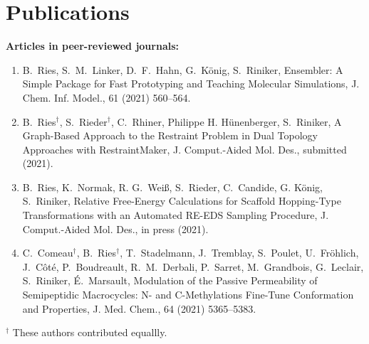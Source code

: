 \chapter{Publications}
\noindent \textbf{Articles in peer-reviewed journals:}
\begin{enumerate}
\item B.\ Ries, S.\ M.\ Linker, D.\ F.\ Hahn, G.\ K\"onig, S.\ Riniker, Ensembler: A Simple Package for Fast Prototyping and Teaching Molecular Simulations, {J. Chem. Inf. Model.}, {61} (2021) 560--564.

\item B.\ Ries$^\dag$, S.\ Rieder$^\dag$, C.\ Rhiner, Philippe H. H\"unenberger, S.\ Riniker, A Graph-Based Approach to the Restraint Problem in Dual Topology Approaches with RestraintMaker, {J. Comput.-Aided Mol. Des.}, submitted (2021).

\item B.\ Ries, K.\ Normak, R. G.\ Wei\ss, S.\ Rieder, C.\ Candide, G. K\"onig, S.\ Riniker, Relative Free-Energy Calculations for Scaffold Hopping-Type Transformations with an Automated RE-EDS Sampling Procedure, {J. Comput.-Aided Mol. Des.}, in press (2021).

\item C.\ Comeau$^\dag$, B.\ Ries$^\dag$, T.\ Stadelmann, J.\ Tremblay, S.\ Poulet, U.\ Fröhlich, J.\ Côté, P.\ Boudreault, R.\ M.\ Derbali, P.\ Sarret, M.\ Grandbois, G.\ Leclair, S.\ Riniker, \'E.\ Marsault, Modulation of the Passive Permeability of Semipeptidic Macrocycles: N- and C-Methylations Fine-Tune Conformation and Properties, {J. Med. Chem.}, {64} (2021) 5365--5383.
\end{enumerate}
\noindent $^\dag$ These authors contributed equallly. \\


